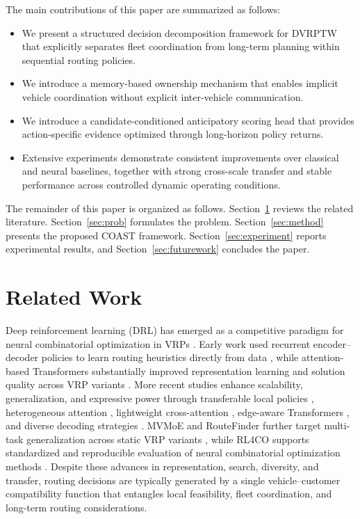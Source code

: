 \documentclass[letterpaper]{article}
\begin{document}
The main contributions of this paper are summarized as follows:

\begin{itemize}
    \item We present a structured decision decomposition framework for DVRPTW that explicitly separates fleet coordination from long-term planning within sequential routing policies.
    \item We introduce a memory-based ownership mechanism that enables implicit vehicle coordination without explicit inter-vehicle communication.
    \item We introduce a candidate-conditioned anticipatory scoring head that provides action-specific evidence optimized through long-horizon policy returns.
    \item Extensive experiments demonstrate consistent improvements over classical and neural baselines, together with strong cross-scale transfer and stable performance across controlled dynamic operating conditions.
\end{itemize}


The remainder of this paper is organized as follows. Section~\ref{sec:related} reviews the related literature. Section~\ref{sec:prob} formulates the problem. Section~\ref{sec:method} presents the proposed COAST framework. Section~\ref{sec:experiment} reports experimental results, and Section~\ref{sec:futurework} concludes the paper.


\section{Related Work}
\label{sec:related}

Deep reinforcement learning (DRL) has emerged as a competitive paradigm for neural combinatorial optimization in VRPs \cite{nazari2018reinforcement}. Early work used recurrent encoder--decoder policies to learn routing heuristics directly from data \cite{nazari2018reinforcement}, while attention-based Transformers substantially improved representation learning and solution quality across VRP variants \cite{kool2018attention}. More recent studies enhance scalability, generalization, and expressive power through transferable local policies \cite{gao2023towards}, heterogeneous attention \cite{wang2024deep}, lightweight cross-attention \cite{luo2025boosting}, edge-aware Transformers \cite{meng2025eformer}, and diverse decoding strategies \cite{hottung2025polynet}. MVMoE and RouteFinder further target multi-task generalization across static VRP variants \cite{zhou2024mvmoe,berto2025routefinder}, while RL4CO supports standardized and reproducible evaluation of neural combinatorial optimization methods \cite{berto2025rl4co}. Despite these advances in representation, search, diversity, and transfer, routing decisions are typically generated by a single vehicle--customer compatibility function that entangles local feasibility, fleet coordination, and long-term routing considerations.
\end{document}
